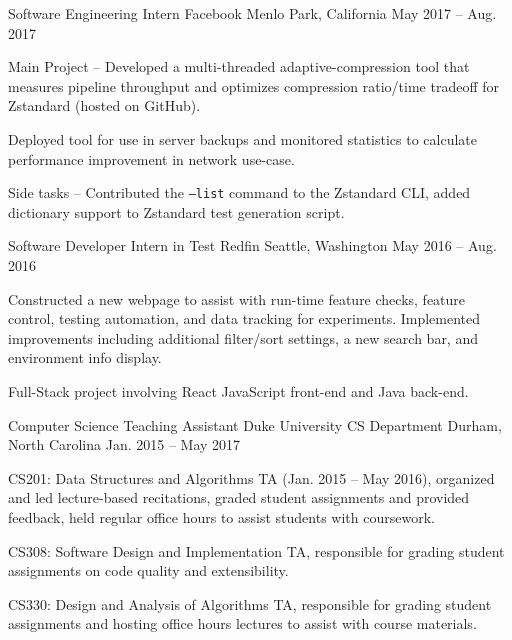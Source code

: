 \begin{cventries}
  \cventry
    {Software Engineering Intern}
    {Facebook}
    {Menlo Park, California}
    {May 2017 -- Aug. 2017}
    {
      \begin{cvitems}
        \item {Main Project -- Developed a multi-threaded adaptive-compression tool that measures pipeline throughput and optimizes compression ratio/time tradeoff for Zstandard (hosted on GitHub).}
        \item {Deployed tool for use in server backups and monitored statistics to calculate performance improvement in network use-case.}
        \item {Side tasks -- Contributed the \texttt{--list} command to the Zstandard CLI, added dictionary support to Zstandard test generation script.}
      \end{cvitems}
    }
  \cventry
    {Software Developer Intern in Test}
    {Redfin}
    {Seattle, Washington}
    {May 2016 -- Aug. 2016}
    {
      \begin{cvitems}
        \item {Constructed a new webpage to assist with run-time feature checks, feature control, testing automation, and data tracking for experiments. Implemented improvements including additional filter/sort settings, a new search bar, and environment info display.}
        \item {Full-Stack project involving React JavaScript front-end and Java back-end.}
      \end{cvitems}
    }
  \cventry
    {Computer Science Teaching Assistant}
    {Duke University CS Department}
    {Durham, North Carolina}
    {Jan. 2015 -- May 2017}
    {
      \begin{cvitems}
        \item {CS201: Data Structures and Algorithms TA (Jan. 2015 -- May 2016), organized and led lecture-based recitations, graded student assignments and provided feedback, held regular office hours to assist students with coursework.}
        \item {CS308: Software Design and Implementation TA, responsible for grading student assignments on code quality and extensibility.}
        \item {CS330: Design and Analysis of Algorithms TA, responsible for grading student assignments and hosting office hours lectures to assist with course materials.}
      \end{cvitems}
    }
  \cventry

\end{cventries}
